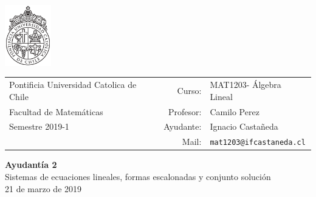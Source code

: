 \documentclass[12pt]{article}
\makeatletter
\newcommand{\ayudantia}{{\sc Ayudantía 2}}
\newcommand{\tituloayu}{Sistemas de ecuaciones lineales, formas escalonadas y conjunto solución}
\newcommand{\fecha}{21 de marzo de 2019}
\newcommand{\sigla}{MAT1203}
\newcommand{\nombre}{Álgebra Lineal}
\newcommand{\profesor}{Camilo Perez}
\newcommand{\ano}{2019}
\newcommand{\semestre}{1}
\newcommand{\mail}{mat1203@ifcastaneda.cl}
\makeatother
\begin{document}
\thispagestyle{empty}

\begin{minipage}{2cm}
	\includegraphics[width=2cm]{../../../../img/logo.pdf}
	\vspace{0.5cm}
\end{minipage}
\begin{minipage}{\linewidth}
	\begin{tabular}{lrl}
		{\scriptsize\sc Pontificia Universidad Catolica de Chile} & \hspace*{0.7in}Curso: &
		\sigla  - \nombre\\
		{\sc Facultad de Matemáticas}&
		Profesor: & \profesor \\
		{\sc Semestre \ano-\semestre} & Ayudante: & {Ignacio Castañeda}\\
		& {Mail:} & \texttt{\mail}
	\end{tabular}
\end{minipage}

\vspace{-10mm}
\begin{center}
	{\LARGE\bf \ayudantia}\\
	\vspace{0.1cm}
	{\tituloayu}\\
	\vspace{0.1cm}
	\fecha\\
	\vspace{0.4cm}
\end{center}
\end{document}
